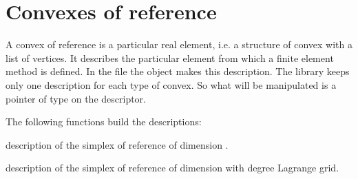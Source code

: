 \documentclass[a4paper,11pt,english]{sphinxmanual}
\begin{document}
\section{Convexes of reference}
\label{\detokenize{project/femdesc:convexes-of-reference}}
A convex of reference is a particular real element, i.e. a structure of convex
with a list of vertices. It describes the particular element from which a finite
element method is defined. In the file  the object
 makes this description. The library keeps only one description for each
type of convex. So what will be manipulated is a pointer of type  on the
descriptor.

The following functions build the descriptions:

\begin{fulllineitems}
\label{\detokenize{project/femdesc:_CPPv4N5bgeot20simplex_of_referenceE8dim_type}}%
\pysigstartmultiline
{}%
\pysigstopmultiline
description of the simplex of reference of dimension .

\end{fulllineitems}


\begin{fulllineitems}
\label{\detokenize{project/femdesc:_CPPv4N5bgeot20simplex_of_referenceE8dim_type10short_type}}%
\pysigstartmultiline
{}%
\pysigstopmultiline
description of the simplex of reference of dimension  with degree 
Lagrange grid.

\end{fulllineitems}

\end{document}
